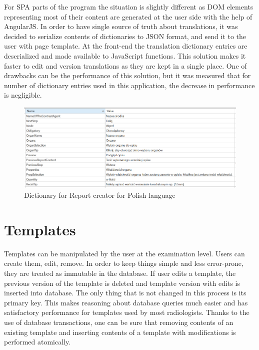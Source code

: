 \documentclass[12pt, twoside, openany]{report}
\theoremstyle{definition}
\begin{document}
For SPA parts of the program the situation is slightly different as DOM elements representing most of their content are generated at the user side with the help of AngularJS. In order to have single source of truth about translations, it was decided to serialize contents of dictionaries to JSON format, and send it to the user with page template. At the front-end the translation dictionary entries are deserialized and made available to JavaScript functions. This solution makes it faster to edit and version translations as they are kept in a single place. One of drawbacks can be the performance of this solution, but it was measured that for number of dictionary entries used in this application, the decrease in performance is negligible.
 
\begin{figure}
    \centering
    \includegraphics[width=1\linewidth]{language-dictionary}
    \caption{Dictionary for Report creator for Polish language\label{fig:language-dictionary}}
\end{figure}
\section{Templates}
Templates can be manipulated by the user at the examination level. Users can create them, edit, remove. In order to keep things simple and less error-prone, they are treated as immutable in the database. If user edits a template, the previous version of the template is deleted and template version with edits is inserted into database. The only thing that is not changed in this process is its primary key. This makes reasoning about database queries much easier and has satisfactory performance for templates used by most radiologists. Thanks to the use of database transactions, one can be sure that removing contents of an existing template and inserting contents of a template with modifications is performed atomically.
\end{document}
